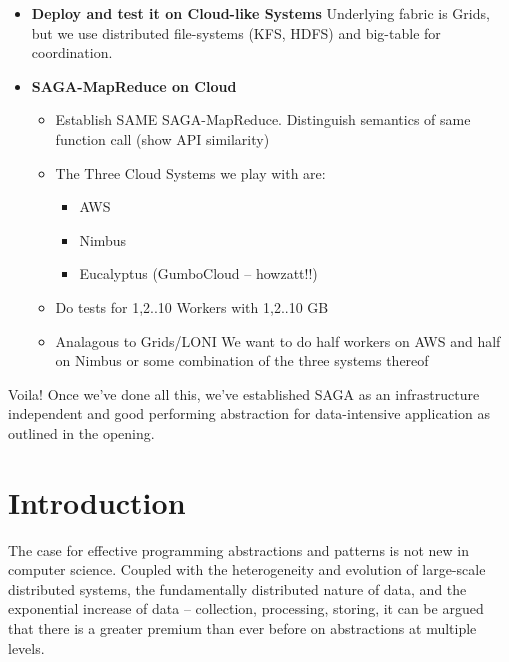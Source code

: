 \documentclass[conference,final]{IEEEtran}
\begin{document}
{\begin{itemize}
\item {\bf Deploy and test it on Cloud-like Systems} Underlying fabric
  is Grids, but we use distributed file-systems (KFS, HDFS) and
  big-table for coordination.
\item {\bf SAGA-MapReduce on Cloud}
  \begin{itemize}
  \item Establish SAME SAGA-MapReduce. Distinguish semantics of same
    function call (show API similarity)
  \item The Three Cloud Systems we play with are:
    \begin{itemize}
    \item AWS
    \item Nimbus
    \item Eucalyptus (GumboCloud -- howzatt!!)
    \end{itemize}
  \item Do tests for 1,2..10 Workers with 1,2..10 GB
  \item Analagous to Grids/LONI We want to do half workers on AWS and
    half on Nimbus or some combination of the three systems thereof
  \end{itemize}
\end{itemize}

Voila! Once we've done all this, we've established SAGA as an
infrastructure independent and good performing abstraction for
data-intensive application as outlined in the opening.}

\section{Introduction} 

The case for effective programming abstractions and patterns is not
new in computer science.  Coupled with the heterogeneity and evolution
of large-scale distributed systems, the fundamentally distributed
nature of data, and the exponential increase of data -- collection,
processing, storing, it can be argued that there is a greater premium
than ever before on abstractions at multiple levels.

\end{document}
